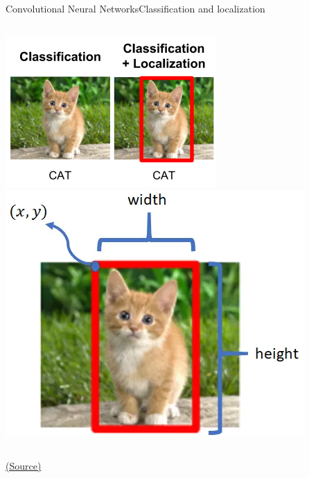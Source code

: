 \documentclass[10pt,compress]{beamer} %
\begin{document}
\begin{frame}{Convolutional Neural Networks}{Classification and localization}
    \begin{columns}
        	\includegraphics[width=\textwidth]{figs/localization-2.png}
        \includegraphics[width=\textwidth]{figs/localization.png}
    \end{columns}
	    \centering
	\scriptsize\href{https://medium.com/@rajshekhar_k/object-localization-series-2-1-basic-object-classification-with-localization-3c8e35fbd0f1}{(Source)}
\end{frame}
\end{document}

